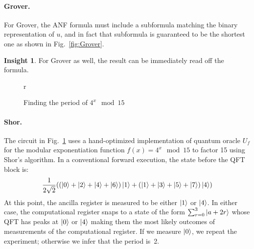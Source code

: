 \documentclass[sigplan,screen]{acmart}
\theoremstyle{definition}
\newtheorem*{insight}{Insight}
\begin{document}
\paragraph*{Grover.}
For Grover, the ANF formula must include a
subformula matching the binary representation of $u$, and in fact that
subformula is guaranteed to be the shortest one as shown in Fig.~\ref{fig:Grover}.

\begin{insight}
  For Grover as well, the result can be immediately read off the formula.
\end{insight}

\begin{figure}{r}
\begin{center}
\end{center}
\caption{\label{fig:shor15}Finding the period of $4^x \mod{15}$}
\end{figure}

\paragraph*{Shor.}
The circuit in Fig.~\ref{fig:shor15} uses a hand-optimized
implementation of quantum oracle $U_f$ for the modular exponentiation
function $f(x) = 4^x \mod{15}$ to factor 15 using Shor's algorithm.
In a conventional forward execution, the state before the QFT block
is:
\[
\frac{1}{2\sqrt{2}} (
  (\ket{0} + \ket{2} + \ket{4} + \ket{6}) \ket{1} +
  (\ket{1} + \ket{3} + \ket{5} + \ket{7}) \ket{4}
  )
\]
At this point, the ancilla register is measured to be either $\ket{1}$ or
$\ket{4}$. In either case, the computational register snaps to a state
of the form $\sum_{r=0}^3 \ket{a+2r}$ whose QFT has peaks at $\ket{0}$
or $\ket{4}$ making them the most likely outcomes of measurements of
the computational register. If we measure $\ket{0}$, we repeat the
experiment; otherwise we infer that the period is~2.
\end{document}
